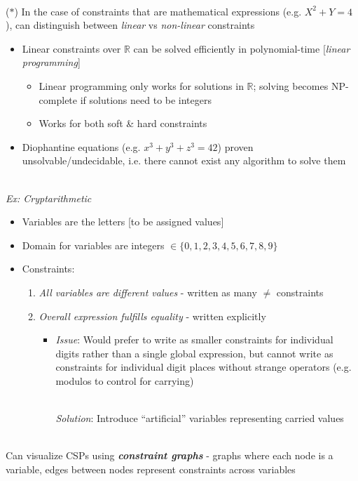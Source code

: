 \documentclass[12pt]{extarticle}
\theoremstyle{definition}
\theoremstyle{remark}
\newcommand{\pstart}[0]{\noindent}
\newcommand{\newp}[0]{~\\ \pstart}
\newcommand{\term}[1]{\noindent\textbf{\textit{#1}}}
\begin{document}
\newp
($\ast$) In the case of constraints that are mathematical expressions (e.g. $X^2+Y=4$), can distinguish between \textit{linear} vs \textit{non-linear} constraints \begin{itemize}
    \item Linear constraints over $\mathbb{R}$ can be solved efficiently in polynomial-time [\textit{linear programming}] \begin{itemize}
        \item Linear programming only works for solutions in $\mathbb{R}$; solving becomes NP-complete if solutions need to be integers
        \item Works for both soft \& hard constraints
    \end{itemize}
    \item Diophantine equations (e.g. $x^3+y^3+z^3=42$) proven unsolvable/undecidable, i.e. there cannot exist any algorithm to solve them
\end{itemize}


\newp
\textit{Ex: Cryptarithmetic} \begin{itemize}
    \item Variables are the letters [to be assigned values]
    \item Domain for variables are integers $\in\{0,1,2,3,4,5,6,7,8,9\}$
    \item Constraints: \begin{enumerate}
        \item \textit{All variables are different values} - written as many $\neq$ constraints
        \item \textit{Overall expression fulfills equality} - written explicitly \begin{itemize}
            \item \textit{Issue}: Would prefer to write as smaller constraints for individual digits rather than a single global expression, but cannot write as constraints for individual digit places without strange operators (e.g. modulos to control for carrying)

            \newp
            \textit{Solution}: Introduce ``artificial'' variables representing carried values
        \end{itemize}
    \end{enumerate}
\end{itemize}


\newp
Can visualize CSPs using \term{constraint graphs} - graphs where each node is a variable, edges between nodes represent constraints across variables 
\end{document}
